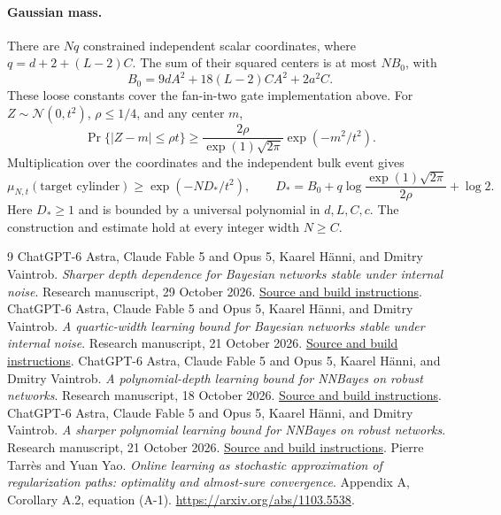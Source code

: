 \documentclass[11pt]{article}
\begin{document}
\paragraph{Gaussian mass.}
There are $Nq$ constrained independent scalar coordinates, where
$q=d+2+(L-2)C$. The sum of their squared centers is at most $NB_0$, with
\[
 B_0=9dA^2+18(L-2)CA^2+2a^2C.
\]
These loose constants cover the fan-in-two gate implementation above.
For $Z\sim\mathcal N(0,t^2)$, $\rho\le1/4$, and any center $m$,
\[
 \Pr\{|Z-m|\le\rho t\}
 \ge\frac{2\rho}{\exp(1)\sqrt{2\pi}}\exp(-m^2/t^2).
\]
Multiplication over the coordinates and the independent bulk event gives
\begin{equation}\label{eq:standalone-cylinder-mass}
 \mu_{N,t}(\text{target cylinder})
 \ge\exp(-ND_*/t^2),\qquad
 D_*=B_0+q\log\frac{\exp(1)\sqrt{2\pi}}{2\rho}+\log2.
\end{equation}
Here $D_*\ge1$ and is bounded by a universal polynomial in $d,L,C,c$.
The construction and estimate hold at every integer width $N\ge C$.











\begin{thebibliography}{9}
ChatGPT-6 Astra, Claude Fable 5 and Opus 5, Kaarel H\"anni, and Dmitry Vaintrob.
\emph{Sharper depth dependence for Bayesian networks stable under internal noise}.
Research manuscript, 29 October 2026.
\href{https://github.com/kaarelh/AI-works/tree/main/neural-network-generalization/works-in-progress/sequential-robust-quantization}{Source and build instructions}.
ChatGPT-6 Astra, Claude Fable 5 and Opus 5, Kaarel H\"anni, and Dmitry Vaintrob.
\emph{A quartic-width learning bound for Bayesian networks stable under internal noise}.
Research manuscript, 21 October 2026.
\href{https://github.com/kaarelh/AI-works/tree/main/neural-network-generalization/works-in-progress/improved-polynomials/original-support}{Source and build instructions}.
ChatGPT-6 Astra, Claude Fable 5 and Opus 5, Kaarel H\"anni, and Dmitry Vaintrob.
\emph{A polynomial-depth learning bound for NNBayes on robust networks}.
Research manuscript, 18 October 2026.
\href{https://github.com/kaarelh/AI-works/tree/main/neural-network-generalization/main-results/robust-polynomial-depth}{Source and build instructions}.
ChatGPT-6 Astra, Claude Fable 5 and Opus 5, Kaarel H\"anni, and Dmitry Vaintrob.
\emph{A sharper polynomial learning bound for NNBayes on robust networks}.
Research manuscript, 21 October 2026.
\href{https://github.com/kaarelh/AI-works/tree/main/neural-network-generalization/works-in-progress/improved-polynomials/original-support-all-scales}{Source and build instructions}.
Pierre Tarr\`es and Yuan Yao.
\emph{Online learning as stochastic approximation of regularization paths:
optimality and almost-sure convergence}.
Appendix A, Corollary A.2, equation (A-1).
\url{https://arxiv.org/abs/1103.5538}.
\end{thebibliography}
\end{document}
